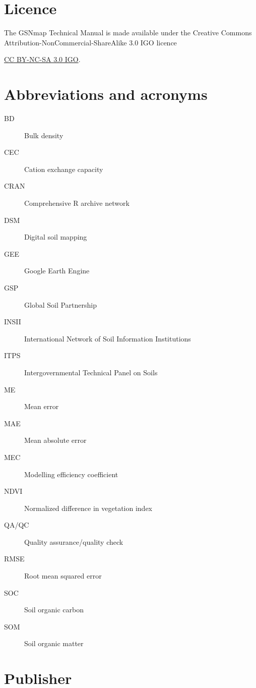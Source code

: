 \documentclass[
  10pt,
  b5paper,
  oneside]{book}
\begin{document}
\hypertarget{licence}{%
\chapter*{Licence}\label{licence}}

The GSNmap Technical Manual is made available under the Creative Commons Attribution-NonCommercial-ShareAlike 3.0 IGO licence

\href{https://creativecommons.org/licenses/by-nc-sa/3.0/igo/legalcode}{CC BY-NC-SA 3.0 IGO}.

\hypertarget{abbreviations-and-acronyms}{%
\chapter*{Abbreviations and acronyms}\label{abbreviations-and-acronyms}}

\begin{description}
\item[BD]
Bulk density
\item[CEC]
Cation exchange capacity
\item[CRAN]
Comprehensive R archive network
\item[DSM]
Digital soil mapping
\item[GEE]
Google Earth Engine
\item[GSP]
Global Soil Partnership
\item[INSII]
International Network of Soil Information Institutions
\item[ITPS]
Intergovernmental Technical Panel on Soils
\item[ME]
Mean error
\item[MAE]
Mean absolute error
\item[MEC]
Modelling efficiency coefficient
\item[NDVI]
Normalized difference in vegetation index
\item[QA/QC]
Quality assurance/quality check
\item[RMSE]
Root mean squared error
\item[SOC]
Soil organic carbon
\item[SOM]
Soil organic matter
\end{description}

\hypertarget{publisher}{%
\chapter*{Publisher}\label{publisher}}
\end{document}
